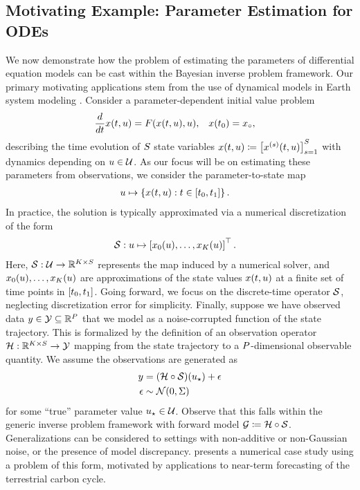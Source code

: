 \documentclass[12pt]{article}
\begin{document}
\subsection{Motivating Example: Parameter Estimation for ODEs} \label{dynamical_models}
We now demonstrate how the problem of estimating the parameters of differential equation models 
 can be cast within the Bayesian inverse problem framework. Our primary motivating applications 
 stem from the use of dynamical models in Earth system modeling  \citep{ESM_modeling_2pt0,paramLSM}.
Consider a parameter-dependent initial value problem 
\begin{align}
\frac{d}{d\Time} \state(\Time, \Par) &= \odeRHS(\state(\Time, \Par), \Par), &&x(\timeStart) = \stateIC, \label{ode_ivp}
\end{align}
describing the time evolution of $\dimState$ state variables 
$\state(\Time, \Par) \Def \left[\indexState{\state}(\Time, \Par)\right]_{\stateIndex=1}^{\dimState}$
with dynamics depending on $\Par \in \parSpace$. As our focus will be on estimating these parameters 
from observations, we consider the parameter-to-state map
\begin{align}
\Par &\mapsto \left\{\state(\Time, \Par) :  \Time \in [\timeStart, \timeEnd] \right\}.
\end{align}
In practice, the solution is typically approximated via a numerical discretization of the form 
\begin{align}
\solutionOp: \Par &\mapsto \left[\indexTime[0]{\state}(\Par), \dots, \indexTime[\NTimeStep]{\state}(\Par) \right]^\top. \label{eq:ode-solution-op}
\end{align}
Here, $\solutionOp: \parSpace \to \R^{\NTimeStep \times \dimState}$ represents the map induced by a numerical solver, 
and $\indexTime[0]{\state}(\Par), \dots, \indexTime[\NTimeStep]{\state}(\Par)$ are approximations of the state 
values $\state(\Time, \Par)$ at a finite set of time points in $[\timeStart, \timeEnd]$. 
Going forward, we focus on the discrete-time operator $\solutionOp$, neglecting discretization error
for simplicity. Finally, suppose we have observed data $\obs \in \obsSpace \subseteq \R^{\dimObs}$ that we model as a
noise-corrupted function of the state trajectory. This is formalized by the definition of an observation operator 
$\obsOp: \R^{\NTimeStep \times \dimState} \to \obsSpace$ mapping from the state trajectory to a 
$\dimObs$-dimensional observable quantity. We assume the observations are generated as 
\begin{align}
\obs &= (\obsOp \circ \solutionOp)(\ParTrue) + \noise \label{ode_inv_prob} \\
\noise &\sim \Gaussian(0, \likPar) \nonumber 
\end{align}
for some ``true'' parameter value $\ParTrue \in \parSpace$. Observe that this falls within the generic 
inverse problem framework with forward model $\fwd \Def \obsOp \circ \solutionOp$. 
Generalizations can be considered to settings with non-additive or non-Gaussian noise, or the 
presence of model discrepancy.  presents a numerical case study using 
a problem of this form, motivated by applications to near-term forecasting of the 
terrestrial carbon cycle.
\end{document}
